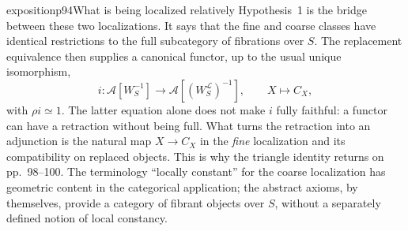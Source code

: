 \begin{dcomment}{exposition}{p94}{What is being localized relatively}
Hypothesis~1 is the bridge between these two localizations. It says that the fine and coarse classes have identical restrictions to the full subcategory of fibrations over $S$. The replacement equivalence then supplies a canonical functor, up to the usual unique isomorphism,
\[
i:\mathcal A[W_S^{-1}]\longrightarrow
\mathcal A[(W_S^{\mathcal L})^{-1}],
\qquad X\longmapsto C_X,
\]
with $\rho i\simeq1$. The latter equation alone does not make $i$ fully faithful: a functor can have a retraction without being full. What turns the retraction into an adjunction is the natural map $X\to C_X$ in the \emph{fine} localization and its compatibility on replaced objects. This is why the triangle identity returns on pp.~98--100. The terminology ``locally constant'' for the coarse localization has geometric content in the categorical application; the abstract axioms, by themselves, provide a category of fibrant objects over $S$, without a separately defined notion of local constancy.
\end{dcomment}

